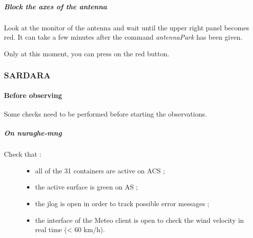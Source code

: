 \documentclass[letterpaper,10pt,english]{sphinxmanual}
\begin{document}
\subparagraph{Block the axes of the antenna}
\label{Continuum/K-band/TP/stop-session:block-the-axes-of-the-antenna}
Look at the monitor of the antenna and wait until the upper right
panel becomes red. It can take a few minutes after the command
\emph{antennaPark} has been given.

Only at this moment, you can press on the red button.


\subsubsection{SARDARA}
\label{Continuum/K-band/SARDARA/index:sardara}\label{Continuum/K-band/SARDARA/index::doc}

\paragraph{Before observing}
\label{Continuum/K-band/SARDARA/before-obs:before-observing}\label{Continuum/K-band/SARDARA/before-obs::doc}
Some checks need to be performed before starting the observations.


\subparagraph{On nuraghe-mng}
\label{Continuum/K-band/SARDARA/before-obs:on-nuraghe-mng}\begin{description}
\item[{Check that :}] \leavevmode\begin{itemize}
\item {} 
all of the 31 containers are active on ACS ;

\item {} 
the active surface is green on AS ;

\item {} 
the jlog is open in order to track possible error messages ;

\item {} 
the interface of the Meteo client is open to check the wind velocity in real time (\textless{} 60 km/h).

\end{itemize}

\end{description}
\end{document}
